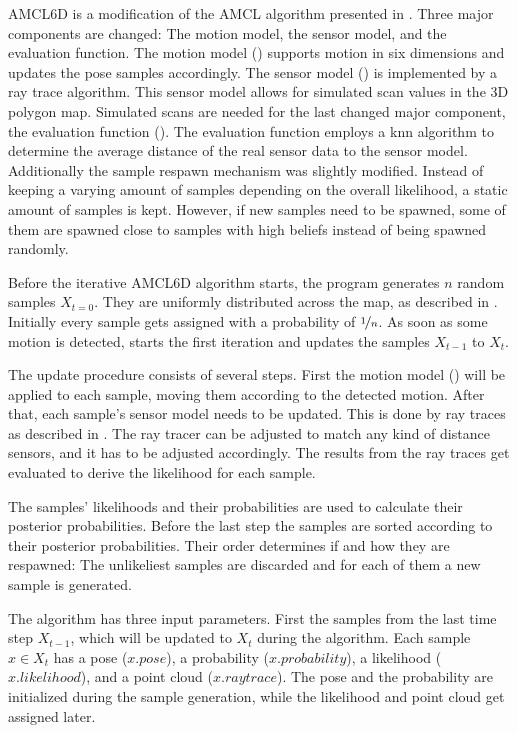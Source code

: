 \documentclass[Thesis.tex]{subfiles}
\begin{document}
\gls{AMCL6D} is a modification of the \gls{AMCL} algorithm presented in \cite{ThrunBurgardFox:2005}. Three major components are changed: The motion model, the sensor model, and the evaluation function. The motion model () supports motion in six dimensions and updates the pose samples accordingly. The sensor model () is implemented by a ray trace algorithm. This sensor model allows for simulated scan values in the 3D polygon map. Simulated scans are needed for the last changed major component, the evaluation function (). The evaluation function employs a \gls{knn} algorithm to determine the average distance of the real sensor data to the sensor model. Additionally the sample respawn mechanism was slightly modified. Instead of keeping a varying amount of samples depending on the overall likelihood, a static amount of samples is kept. However, if new samples need to be spawned, some of them are spawned close to samples with high beliefs instead of being spawned randomly.

Before the iterative \gls{AMCL6D} algorithm starts, the program generates $n$ random samples $X_{t=0}$. They are uniformly distributed across the map, as described in . Initially every sample gets assigned with a probability of $\nicefrac{1}{n}$. As soon as some motion is detected,  starts the first iteration and updates the samples $X_{t-1}$ to $X_{t}$.

The update procedure consists of several steps. First the motion model () will be applied to each sample, moving them according to the detected motion. After that, each sample's sensor model needs to be updated. This is done by ray traces as described in . The ray tracer can be adjusted to match any kind of distance sensors, and it has to be adjusted accordingly. The results from the ray traces get evaluated to derive the likelihood for each sample.

The samples' likelihoods and their probabilities are used to calculate their posterior probabilities. Before the last step the samples are sorted according to their posterior probabilities. Their order determines if and how they are respawned: The unlikeliest samples are discarded and for each of them a new sample is generated.

\smallskip

The algorithm has three input parameters. First the samples from the last time step $X_{t-1}$, which will be updated to $X_t$ during the algorithm. Each sample $x \in X_t$ has a pose ($x.pose$), a probability ($x.probability$), a likelihood ($x.likelihood$), and a point cloud ($x.raytrace$). The pose and the probability are initialized during the sample generation, while the likelihood and point cloud get assigned later.
\end{document}
